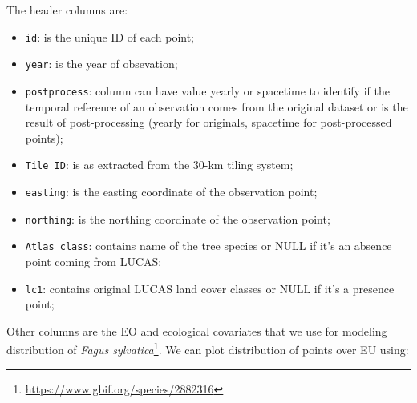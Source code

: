 \documentclass[
  graybox,natbib,nospthms]{svmono}
\providecommand{\tightlist}{%
  \setlength{\itemsep}{0pt}\setlength{\parskip}{0pt}}
\providecommand{\tightlist}{\setlength{\itemsep}{0pt}\setlength{\parskip}{0pt}}
\renewcommand{\href}[2]{#2 (\url{#1})}
\renewcommand{\href}[2]{#2\footnote{\url{#1}}}
\begin{document}
The header columns are:

\begin{itemize}
\tightlist
\item
  \texttt{id}: is the unique ID of each point;\\
\item
  \texttt{year}: is the year of obsevation;\\
\item
  \texttt{postprocess}: column can have value yearly or spacetime to identify
  if the temporal reference of an observation comes from the original
  dataset or is the result of post-processing (yearly for originals,
  spacetime for post-processed points);\\
\item
  \texttt{Tile\_ID}: is as extracted from the 30-km tiling system;\\
\item
  \texttt{easting}: is the easting coordinate of the observation point;\\
\item
  \texttt{northing}: is the northing coordinate of the observation point;\\
\item
  \texttt{Atlas\_class}: contains name of the tree species or NULL if it's an
  absence point coming from LUCAS;\\
\item
  \texttt{lc1}: contains original LUCAS land cover classes or NULL if it's a
  presence point;
\end{itemize}

Other columns are the EO and ecological covariates that we use for
modeling distribution of \href{https://www.gbif.org/species/2882316}{\emph{Fagus sylvatica}}. We can plot distribution of points over EU using:
\end{document}
